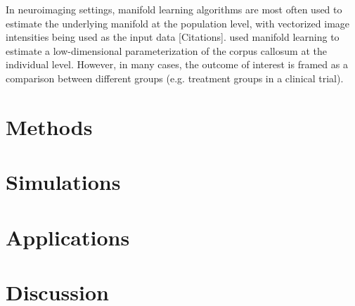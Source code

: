 \documentclass[11pt,reqno]{article}
\theoremstyle{definition}
\begin{document}
In neuroimaging settings, manifold learning algorithms are most often used to estimate the underlying manifold at the population level, with vectorized image intensities being used as the input data [Citations]. \cite{yueParameterizationWhiteMatter2016} used manifold learning to estimate a low-dimensional parameterization of the corpus callosum at the individual level. However, in many cases, the outcome of interest is framed as a comparison between different groups (e.g. treatment groups in a clinical trial). 

\section{Methods}

\section{Simulations}

\section{Applications}

\section{Discussion}

\newpage

\nocite{*}
%
%
\printbibliography
\end{document}
